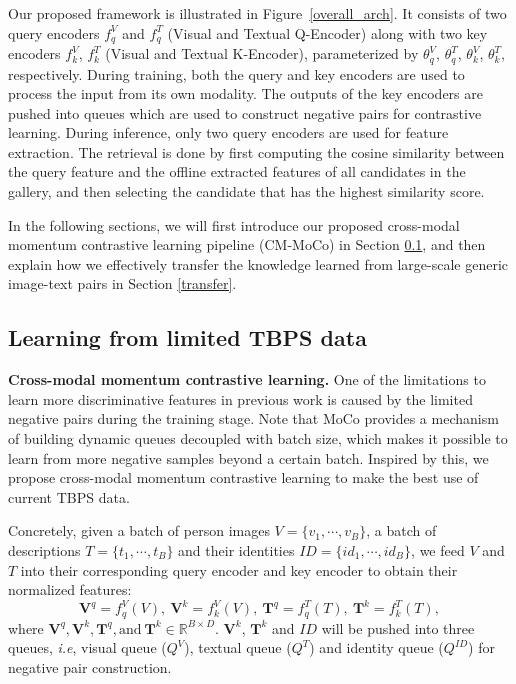 \documentclass{bmvc2k}
\def\ie{\emph{i.e}\bmvaOneDot}
\newcommand{\statement}[1]{\noindent\textbf{#1}}
\begin{document}
Our proposed framework is illustrated in Figure~\ref{overall_arch}. 
It consists of two query encoders $f_{q}^{V}$ and $f_{q}^{T}$ (Visual and Textual Q-Encoder) along with two key encoders $f_{k}^{V}$, $f_{k}^{T}$ (Visual and Textual K-Encoder), parameterized by $\theta_{q}^{V}$, $\theta_{q}^{T}$, $\theta_{k}^{V}$, $\theta_{k}^{T}$, respectively. 
During training, both the query and key encoders are used to process the input from its own modality. 
The outputs of the key encoders are pushed into queues which are used to construct negative pairs for contrastive learning. 
During inference, only two query encoders are used for feature extraction. 
The retrieval is done by first computing the cosine similarity between the query feature and the offline extracted features of all candidates in the gallery, and then selecting the candidate that has the highest similarity score.

In the following sections, we will first introduce our proposed cross-modal momentum contrastive learning pipeline (CM-MoCo) in Section \ref{vta}, and then explain how we effectively transfer the knowledge learned from large-scale generic image-text pairs in Section \ref{transfer}.

\vspace*{-3mm}
\subsection{Learning from limited TBPS data}
\label{vta}
\statement{Cross-modal momentum contrastive learning.}
One of the limitations to learn more discriminative features in previous work is caused by the limited negative pairs during the training stage.
Note that MoCo \cite{he2020moco} provides a mechanism of building dynamic queues decoupled with batch size, which makes it possible to learn from more negative samples beyond a certain batch. 
Inspired by this, we propose cross-modal momentum contrastive learning to make the best use of current TBPS data. 

Concretely, given a batch of person images $V=\{v_1,\cdots,v_B\}$, a batch of descriptions $T=\{t_1,\cdots,t_B\}$ and their identities $ID=\{id_1,\cdots,id_B\}$, we feed $V$ and $T$ into their corresponding query encoder and key encoder to obtain their normalized features:
\begin{equation}
    \mathbf{V}^{q} = f_{q}^{V}(V),\ \mathbf{V}^{k} = f_{k}^{V}(V),\
    \mathbf{T}^{q} = f_{q}^{T}(T),\
    \mathbf{T}^{k} = f_{k}^{T}(T),
\end{equation}
where $\mathbf{V}^q,\mathbf{V}^k,\mathbf{T}^q,\text{and} \ \mathbf{T}^k \in \mathbb{R}^{B \times D}$. $\mathbf{V}^k$, $\mathbf{T}^k$ and $ID$ will be pushed into three queues, \ie, visual queue ($Q^V$), textual queue ($Q^T$) and identity queue ($Q^{ID}$) for negative pair construction. 
\end{document}
